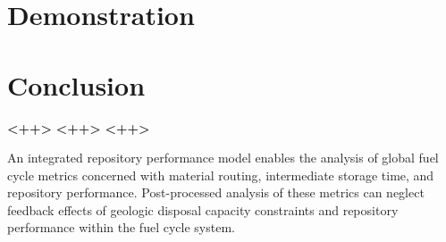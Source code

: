 \documentclass[letterpaper]{article}
\begin{document}
\section{Demonstration}
\section{Conclusion}
\textbf{<++>}
\textbf{<++>}
\textbf{<++>}

An integrated repository performance model enables the analysis of global fuel
cycle metrics concerned with material routing, intermediate storage time, and
repository performance. Post-processed analysis of these metrics can neglect
feedback effects of geologic disposal capacity constraints and repository
performance within the fuel cycle system.


\pagebreak


\end{document}
